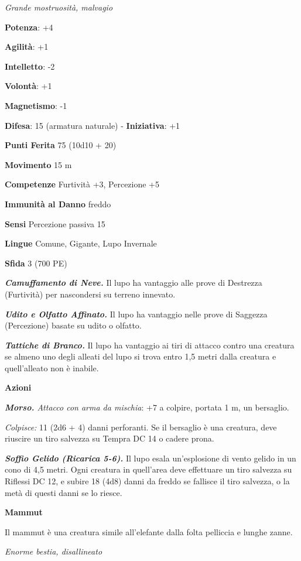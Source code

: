 \begin{multicols}{2}
\emph{Grande mostruosità, malvagio}

\textbf{Potenza}: +4

\textbf{Agilità}: +1

\textbf{Intelletto}: -2

\textbf{Volontà}: +1

\textbf{Magnetismo}: -1

\textbf{Difesa}: 15 (armatura naturale) - \textbf{Iniziativa}: +1

\textbf{Punti Ferita} 75 (10d10 + 20)

\textbf{Movimento} 15 m

\textbf{Competenze} Furtività +3, Percezione +5

\textbf{Immunità al Danno} freddo

\textbf{Sensi} Percezione passiva 15

\textbf{Lingue} Comune, Gigante, Lupo Invernale

\textbf{Sfida} 3 (700 PE)\smallskip

\emph{\textbf{Camuffamento di Neve.}} Il lupo ha vantaggio alle prove di
Destrezza (Furtività) per nascondersi su terreno innevato.

\emph{\textbf{Udito e Olfatto Affinato.}} Il lupo ha vantaggio nelle
prove di Saggezza (Percezione) basate su udito o olfatto.

\emph{\textbf{Tattiche di Branco.}} Il lupo ha vantaggio ai tiri di
attacco contro una creatura se almeno uno degli alleati del lupo si
trova entro 1,5 metri dalla creatura e quell'alleato non è inabile.

\smallskip\textbf{Azioni}

\emph{\textbf{Morso.} Attacco con arma da mischia}: +7 a colpire,
portata 1 m, un bersaglio.

\emph{Colpisce:} 11 (2d6 + 4) danni perforanti. Se il bersaglio è una
creatura, deve riuscire un tiro salvezza su Tempra DC 14 o cadere prona.

\emph{\textbf{Soffio Gelido (Ricarica 5-6).}} Il lupo esala
un'esplosione di vento gelido in un cono di 4,5 metri. Ogni creatura in
quell'area deve effettuare un tiro salvezza su Riflessi DC 12, e subire
18 (4d8) danni da freddo se fallisce il tiro salvezza, o la metà di
questi danni se lo riesce.

\textbf{Mammut}

Il mammut è una creatura simile all'elefante dalla folta pelliccia e
lunghe zanne.

\emph{Enorme bestia, disallineato}


\end{multicols}
